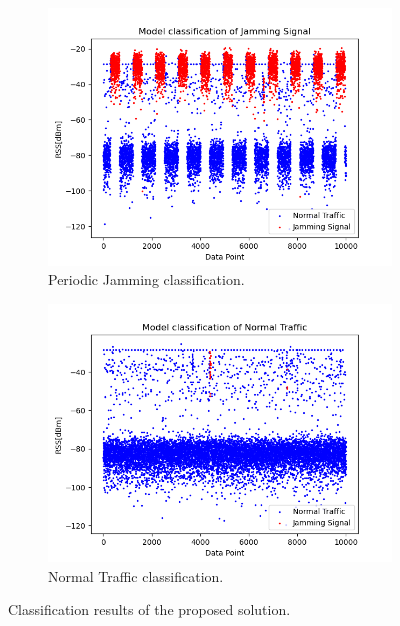\documentclass[futureinternet,article,submit,pdftex,moreauthors]{Definitions/mdpi}
\begin{document}
\begin{figure}[H]
	\centering
	\begin{subfigure}{0.49\textwidth}
		\centering
		\includegraphics[width=\textwidth]{img/OnlyPeriodicJamming.png}
		\caption{Periodic Jamming classification.}
		\label{fig:periodicJammingClassification}
	\end{subfigure}
	\hfill
	\begin{subfigure}{0.49\textwidth}
		\centering
		\includegraphics[width=\textwidth]{img/OnlyNormalTraffic.png}
		\caption{Normal Traffic classification.}
		\label{fig:normalTrafficClassification}
	\end{subfigure}
	\caption{Classification results of the proposed solution.}
	\label{fig:proposedSolutionClassification}
\end{figure}
\end{document}
